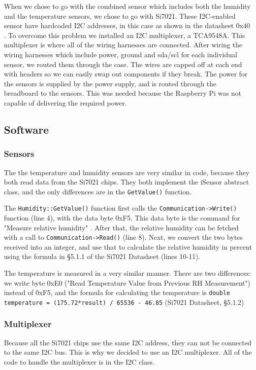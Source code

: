 \documentclass[a4paper,oneside]{book}
\begin{document}
When we chose to go with the combined sensor which includes both the humidity
and the temperature sensors, we chose to go with Si7021. These I2C-enabled
sensor have hardcoded I2C addresses, in this case as shown in the datasheet
0x40 \cite{Si7021}. To overcome this problem we installed an I2C multiplexer, a
TCA9548A. This multiplexer is where all of the wiring harnesses are connected.
After wiring the wiring harnesses which include power, ground and sda/scl for
each individual sensor, we routed them through the case. The wires are capped
off at each end with headers so we can easily swap out components if they
break. The power for the sensors is supplied by the power supply, and is routed
through the breadboard to the sensors. This was needed because the Raspberry Pi
was not capable of delivering the required power.

\subsection{Software}
\subsubsection{Sensors}
The the temperature and humidity sensors are very similar in code, because they
both read data from the Si7021 chips. They both implement the iSensor abstract
class, and the only differences are in the \lstinline|GetValue()| function.

The \lstinline|Humidity::GetValue()| function first calls the \lstinline|Communication->Write()|
function (line 4), with the data byte 0xF5. This data byte is the command for
"Measure relative humidity" \cite{Si7021}. After that, the
relative humidity can be fetched with a call to \lstinline|Communication->Read()| (line 8).
Next, we convert the two bytes received into an integer, and use that to
calculate the relative humidity in percent using the formula in \S5.1.1 of the
Si7021 Datasheet (lines 10-11).



The temperature is measured in a very similar manner. There are two
differences: we write byte 0xE0 ("Read Temperature Value from Previous RH
Measurement") instead of 0xF5, and the formula for calculating the temperature
is \lstinline|double temperature = (175.72*result) / 65536 - 46.85| (Si7021
Datasheet, \S5.1.2)

\subsubsection{Multiplexer}
Because all the Si7021 chips use the same I2C address, they can not be
connected to the same I2C bus. This is why we decided to use an I2C
multiplexer. All of the code to handle the multiplexer is in the I2C class.
\end{document}
